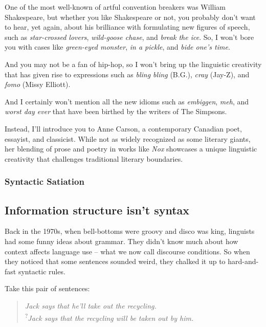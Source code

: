 One of the most well-known of artful convention breakers was William Shakespeare, but whether you like Shakespeare or not, you probably don't want to hear, yet again, about his brilliance with formulating new figures of speech, such as \textit{star-crossed lovers}, \textit{wild-goose chase}, and \textit{break the ice}. So, I won't bore you with cases like \textit{green-eyed monster}, \textit{in a pickle}, and \textit{bide one's time}.

And you may not be a fan of hip-hop, so I won't bring up the linguistic creativity that has given rise to expressions such as \textit{bling bling} (B.G.), \textit{cray} (Jay-Z), and \textit{fomo} (Missy Elliott).

And I certainly won't mention all the new idioms such as \textit{embiggen}, \textit{meh}, and \textit{worst day ever} that have been birthed by the writers of The Simpsons.

Instead, I'll introduce you to Anne Carson, a contemporary Canadian poet, essayist, and classicist. While not as widely recognized as some literary giants, her blending of prose and poetry in works like \textit{Nox} showcases a unique linguistic creativity that challenges traditional literary boundaries.

\subsubsection{Syntactic Satiation}


\subsection{Information structure isn't syntax}

Back in the 1970s, when bell-bottoms were groovy and disco was king, linguists had some funny ideas about grammar. They didn't know much about how context affects language use -- what we now call discourse conditions. So when they noticed that some sentences sounded weird, they chalked it up to hard-and-fast syntactic rules.

Take this pair of sentences:

\begin{quote}
\textit{Jack says that he'll take out the recycling.}\\
\textsuperscript{?}\textit{Jack says that the recycling will be taken out by him.}
\end{quote}

